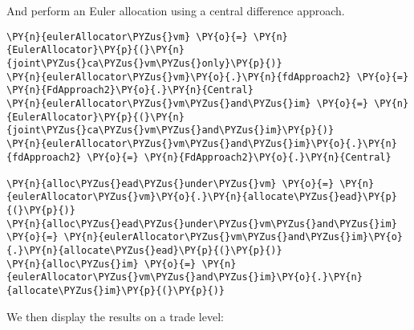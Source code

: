     And perform an Euler allocation using a central difference approach.

    \begin{tcolorbox}[breakable, size=fbox, boxrule=1pt, pad at break*=1mm,colback=cellbackground, colframe=cellborder]
\begin{Verbatim}[commandchars=\\\{\}]
\PY{n}{eulerAllocator\PYZus{}vm} \PY{o}{=} \PY{n}{EulerAllocator}\PY{p}{(}\PY{n}{joint\PYZus{}ca\PYZus{}vm\PYZus{}only}\PY{p}{)}
\PY{n}{eulerAllocator\PYZus{}vm}\PY{o}{.}\PY{n}{fdApproach2} \PY{o}{=} \PY{n}{FdApproach2}\PY{o}{.}\PY{n}{Central}
\PY{n}{eulerAllocator\PYZus{}vm\PYZus{}and\PYZus{}im} \PY{o}{=} \PY{n}{EulerAllocator}\PY{p}{(}\PY{n}{joint\PYZus{}ca\PYZus{}vm\PYZus{}and\PYZus{}im}\PY{p}{)}
\PY{n}{eulerAllocator\PYZus{}vm\PYZus{}and\PYZus{}im}\PY{o}{.}\PY{n}{fdApproach2} \PY{o}{=} \PY{n}{FdApproach2}\PY{o}{.}\PY{n}{Central}

\PY{n}{alloc\PYZus{}ead\PYZus{}under\PYZus{}vm} \PY{o}{=} \PY{n}{eulerAllocator\PYZus{}vm}\PY{o}{.}\PY{n}{allocate\PYZus{}ead}\PY{p}{(}\PY{p}{)}
\PY{n}{alloc\PYZus{}ead\PYZus{}under\PYZus{}vm\PYZus{}and\PYZus{}im} \PY{o}{=} \PY{n}{eulerAllocator\PYZus{}vm\PYZus{}and\PYZus{}im}\PY{o}{.}\PY{n}{allocate\PYZus{}ead}\PY{p}{(}\PY{p}{)}
\PY{n}{alloc\PYZus{}im} \PY{o}{=} \PY{n}{eulerAllocator\PYZus{}vm\PYZus{}and\PYZus{}im}\PY{o}{.}\PY{n}{allocate\PYZus{}im}\PY{p}{(}\PY{p}{)}
\end{Verbatim}
\end{tcolorbox}

    We then display the results on a trade level:

